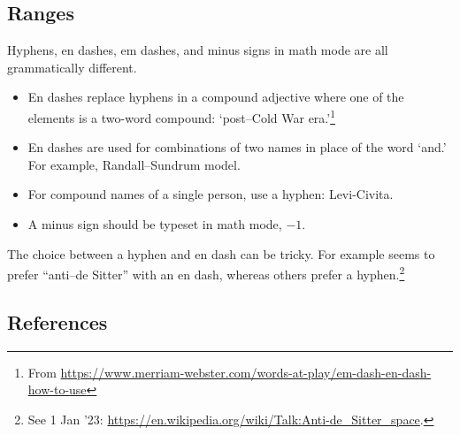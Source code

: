 \subsection{Ranges}

Hyphens, en dashes, em dashes, and minus signs in math mode are all grammatically different.
\begin{itemize}
	\item En dashes replace hyphens in a compound adjective where one of the elements is a two-word compound: `post--Cold War era.'\footnote{From \url{https://www.merriam-webster.com/words-at-play/em-dash-en-dash-how-to-use}}
	\item En dashes are used for combinations of two names in place of the word `and.' For example, Randall--Sundrum model.
	\item For compound names of a single person, use a hyphen: Levi-Civita.
	\item A minus sign should be typeset in math mode, $-1$.
\end{itemize}
The choice between a hyphen and en dash can be tricky. For example  seems to prefer ``anti--de Sitter'' with an en dash, whereas others prefer a hyphen.\footnote{See 1 Jan '23: \url{https://en.wikipedia.org/wiki/Talk:Anti-de_Sitter_space}.}


\subsection{References}

